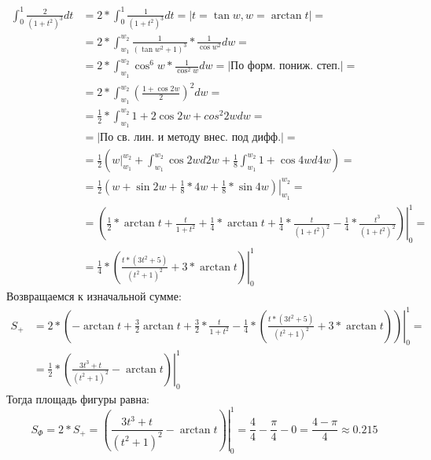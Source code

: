 \documentclass[12pt, a4paper]{article}
\begin{document}
\begin{equation*}
\begin{aligned}
\int_{0}^{1} \frac{2}{\left(1+t^2\right)^3} dt &= 2 * \int_{0}^{1} \frac{1}{\left(1+t^2\right)^3} dt = |t = \tan{w}, w = \arctan{t}| =\\
&=2 * \int_{w_1}^{w_2} \frac{1}{\left(\tan{w}^2+1\right)^3} * \frac{1}{\cos{w}^2} dw = \\
&= 2 * \int_{w_1}^{w_2} \cos^6{w} * \frac{1}{\cos^2{w}} dw = |\text{По форм. пониж. степ.}| =\\
&= 2 * \int_{w_1}^{w_2} \left(\frac{1+\cos{2w}}{2}\right)^2 dw=\\
&= \frac{1}{2} * \int_{w_1}^{w_2} 1 + 2\cos{2w} + cos^2{2w} dw=\\
&= |\text{По св. лин. и методу внес. под дифф.}| =\\
&= \frac{1}{2} \left(w|_{w_1}^{w_2} +  \int_{w_1}^{w_2} \cos{2w} d2w + \frac{1}{8} \int_{w_1}^{w_2} 1 + \cos{4w} d4w\right)  =\\
&= \left.\frac{1}{2} \left(w +  \sin{2w} + \frac{1}{8} * 4w + \frac{1}{8} * \sin{4w}\right)\right|_{w_1}^{w_2} =\\
&=\left.\left(\frac{1}{2} * \arctan{t} + \frac{t}{1+t^2} + \frac{1}{4} * \arctan{t} + \frac{1}{4} * \frac{t}{(1+t^2)^2} - \frac{1}{4} * \frac{t^3}{(1+t^2)^2}\right)\right|_0^1 =\\
&= \left.\frac{1}{4} * \left(\frac{t*(3t^2+5)}{(t^2+1)^2} + 3*\arctan{t}\right)\right|_0^1
\end{aligned}
\end{equation*}
Возвращаемся к изначальной сумме:
\begin{equation*}
\begin{aligned}
S_{+} &= \left.2 * \left( -\arctan{t} + \frac{3}{2}\arctan{t} + \frac{3}{2}*\frac{t}{1+t^2} - \frac{1}{4} * \left(\frac{t*(3t^2+5)}{(t^2+1)^2} + 3*\arctan{t}\right)\right)\right|_0^1=\\
&= \left.\frac{1}{2} * \left(\frac{3t^3+t}{(t^2+1)^2}-\arctan{t}\right)\right|_0^1
\end{aligned}
\end{equation*}
Тогда площадь фигуры равна:
\begin{equation}
S_\Phi = 2*S_{+} = \left.\left(\frac{3t^3+t}{(t^2+1)^2}-\arctan{t}\right)\right|_0^1 = \frac{4}{4} - \frac{\pi}{4} - 0 = \frac{4-\pi}{4} \approx 0.215
\end{equation}
\end{document}
